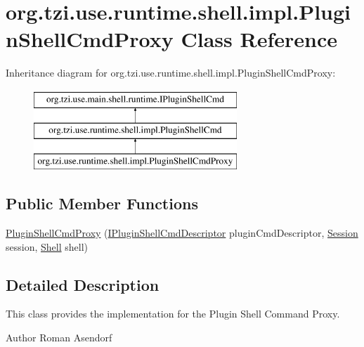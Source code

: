 \hypertarget{classorg_1_1tzi_1_1use_1_1runtime_1_1shell_1_1impl_1_1_plugin_shell_cmd_proxy}{\section{org.\-tzi.\-use.\-runtime.\-shell.\-impl.\-Plugin\-Shell\-Cmd\-Proxy Class Reference}
\label{classorg_1_1tzi_1_1use_1_1runtime_1_1shell_1_1impl_1_1_plugin_shell_cmd_proxy}
}
Inheritance diagram for org.\-tzi.\-use.\-runtime.\-shell.\-impl.\-Plugin\-Shell\-Cmd\-Proxy\-:\begin{figure}[H]
\begin{center}
\leavevmode
\includegraphics[height=3.000000cm]{classorg_1_1tzi_1_1use_1_1runtime_1_1shell_1_1impl_1_1_plugin_shell_cmd_proxy}
\end{center}
\end{figure}
\subsection*{Public Member Functions}
\begin{DoxyCompactItemize}
\item 
\hyperlink{classorg_1_1tzi_1_1use_1_1runtime_1_1shell_1_1impl_1_1_plugin_shell_cmd_proxy_a9ddead9d0352e6ba5f302402473df7bd}{Plugin\-Shell\-Cmd\-Proxy} (\hyperlink{interfaceorg_1_1tzi_1_1use_1_1runtime_1_1shell_1_1_i_plugin_shell_cmd_descriptor}{I\-Plugin\-Shell\-Cmd\-Descriptor} plugin\-Cmd\-Descriptor, \hyperlink{classorg_1_1tzi_1_1use_1_1main_1_1_session}{Session} session, \hyperlink{classorg_1_1tzi_1_1use_1_1main_1_1shell_1_1_shell}{Shell} shell)
\end{DoxyCompactItemize}


\subsection{Detailed Description}
This class provides the implementation for the Plugin Shell Command Proxy.

\begin{DoxyAuthor}{Author}
Roman Asendorf 
\end{DoxyAuthor}


